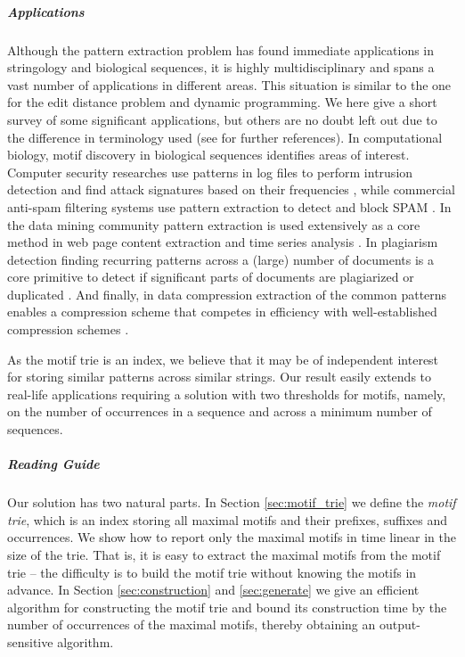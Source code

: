 \subparagraph{Applications}
Although the pattern extraction problem has found immediate applications in stringology and biological sequences, it is highly multidisciplinary and spans a vast number of applications in different areas. This situation is similar to the one for the edit distance problem and dynamic programming. We here give a short survey of some significant applications, but others are no doubt left out due to the difference in terminology used (see \cite{abouelhoda2010string} for further references). 
In computational biology, motif discovery in biological sequences identifies areas of interest\cite{sagot1998spelling,tcsUkkonen09,grossi2011madmx,abouelhoda2010string}. Computer security researches use patterns in log files to perform intrusion detection and find attack signatures based on their frequencies \cite{debar1999towards}, while commercial anti-spam filtering systems use pattern extraction to detect and block SPAM \cite{rigoutsos2004chung}. 
In the data mining community pattern extraction is used extensively \cite{mabroukeh2010taxonomy} as a core method in web page content extraction \cite{chang2003automatic} and time series analysis \cite{pichl2006symbolic,sherkat2006efficiently}.
%
In plagiarism detection finding recurring patterns across a (large) number of documents is a core primitive to detect if significant parts of documents are plagiarized \cite{brin1995copy} or duplicated \cite{baker1995finding,chen2004shared}.
And finally, in data compression extraction of the common patterns enables a compression scheme that competes in efficiency with well-established compression schemes \cite{apostolico2006bridging}.

As the motif trie is an index, we believe that it may be of independent interest for storing similar patterns across similar strings. 
Our result easily extends to real-life applications requiring a solution with two thresholds for motifs, namely, on the number of occurrences in a sequence and across a minimum number of sequences. 


\subparagraph{Reading Guide}
Our solution has two natural parts. In Section \ref{sec:motif_trie} we define the \emph{motif trie}, which is an index storing all maximal motifs and their prefixes, suffixes and occurrences. We show how to report only the maximal motifs in time linear in the size of the trie. That is, it is easy to extract the maximal motifs from the motif trie -- the difficulty is to build the motif trie without knowing the motifs in advance. 
In Section \ref{sec:construction} and \ref{sec:generate} we give an efficient algorithm for constructing the motif trie and bound its construction time by the number of occurrences of the maximal motifs, thereby obtaining an output-sensitive algorithm. 

